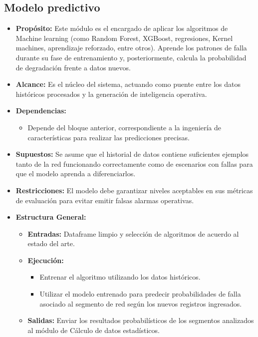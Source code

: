 \documentclass[12pt,a4paper]{article}
\begin{document}
    \subsection{Modelo predictivo}
    \begin{itemize}
        \item \textbf{Propósito:} Este módulo es el encargado de aplicar los algoritmos de Machine learning (como Random Forest, XGBoost, regresiones, Kernel machines, aprendizaje reforzado, entre otros).
        Aprende los patrones de falla durante su fase de entrenamiento y, posteriormente, calcula la probabilidad de degradación frente a datos nuevos.

        \item \textbf{Alcance:} Es el núcleo del sistema, actuando como puente entre los datos históricos procesados y la generación de inteligencia operativa.
        \item \textbf{Dependencias:}
        \begin{itemize}
            \item Depende del bloque anterior, correspondiente a la ingeniería de características para realizar las predicciones precisas.
        \end{itemize}
        \item \textbf{Supuestos:} Se asume que el historial de datos contiene suficientes ejemplos tanto de la red funcionando correctamente como de escenarios con fallas para que el modelo aprenda a diferenciarlos.
        \item \textbf{Restricciones:} El modelo debe garantizar niveles aceptables en sus métricas de evaluación para evitar emitir falsas alarmas operativas.
        \item \textbf{Estructura General:}
        \begin{itemize}
            \item \textbf{Entradas:} Dataframe limpio y selección de algoritmos de acuerdo al estado del arte.
            \item \textbf{Ejecución:}
            \begin{itemize}
                \item Entrenar el algoritmo utilizando los datos históricos.
                \item Utilizar el modelo entrenado para predecir probabilidades de falla asociado al segmento de red según los nuevos registros ingresados.
            \end{itemize}
            \item \textbf{Salidas:} Enviar los resultados probabilísticos de los segmentos analizados al módulo de Cálculo de datos estadísticos.
        \end{itemize}
    \end{itemize}
\end{document}
